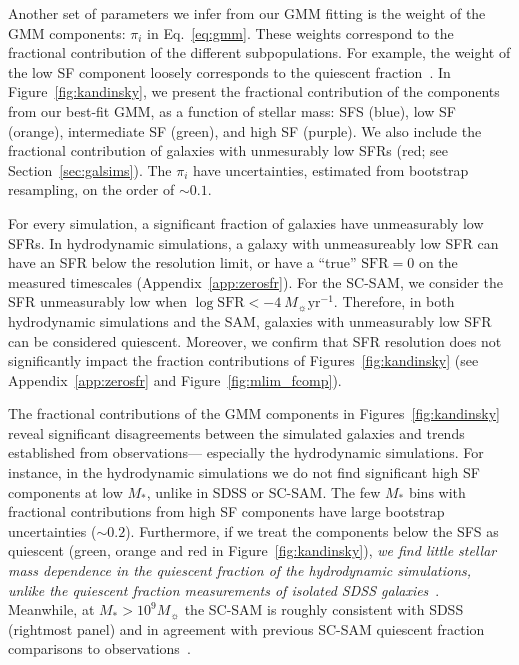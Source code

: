 \documentclass[tighten, preprint]{aastex62}
\newcommand{\todo}[1]{{\bf \textcolor{red}{ #1}}}
\begin{document}
Another set of parameters we infer from our GMM fitting is the weight of the 
GMM components: $\pi_i$ in Eq.~\ref{eq:gmm}. These weights correspond to 
the fractional contribution of the different subpopulations. For example, the 
weight of the low SF component loosely corresponds to the quiescent 
fraction~\citep[\emph{e.g.}][]{borch2006, bundy2006, iovino2010, geha2012, hahn2015}. 
In Figure~\ref{fig:kandinsky}, we present the fractional contribution of the 
components from our best-fit GMM, as a function of stellar mass: SFS (blue), 
low SF (orange),  intermediate SF (green), and high SF (purple). We also include
the fractional contribution of galaxies with unmesurably low SFRs (red; 
see Section~\ref{sec:galsims}). The $\pi_i$ have 
uncertainties, estimated from bootstrap resampling, on the order of ${\sim}0.1$.

For every simulation, a significant fraction of galaxies have unmeasurably 
low SFRs. In hydrodynamic simulations, a galaxy with unmeasureably low SFR 
can have an SFR below the resolution limit, or have a ``true'' $\mathrm{SFR}{=}0$ 
on the measured timescales (Appendix~\ref{app:zerosfr}). For the SC-SAM, we 
consider the SFR unmeasurably low when $\log \mathrm{SFR}< {-}4\ M_\sun \mathrm{yr}^{-1}$. 
Therefore, in both hydrodynamic simulations and the SAM, galaxies with 
unmeasurably low SFR can be considered quiescent. 
Moreover, we confirm that SFR resolution does not significantly 
impact the fraction contributions of Figures~\ref{fig:kandinsky} 
(see Appendix~\ref{app:zerosfr} and Figure~\ref{fig:mlim_fcomp}).%

The fractional contributions of the GMM components in Figures~\ref{fig:kandinsky} %
reveal significant disagreements between the simulated galaxies and 
trends established from observations--- especially the hydrodynamic 
simulations. 
For instance, in the hydrodynamic simulations we do not find significant 
high SF components at low $M_*$, unlike in SDSS or SC-SAM. The few $M_*$ 
bins with fractional contributions from high SF components have large 
bootstrap uncertainties (${\sim}0.2$). %
Furthermore, if we treat the components below the SFS as quiescent 
(green, orange and red in Figure~\ref{fig:kandinsky}),
\emph{we find little stellar mass dependence in the quiescent fraction of the 
hydrodynamic simulations, unlike the quiescent fraction measurements 
of isolated SDSS galaxies}~\citep{baldry2006,peng2010,hahn2015}. 
Meanwhile, at $M_*{>}10^9M_\sun$ the SC-SAM is roughly consistent with 
SDSS (rightmost panel) and in agreement with previous 
SC-SAM quiescent fraction comparisons to observations~\citep{brennan2015,brennan2017,pandya2017}.
\end{document}
